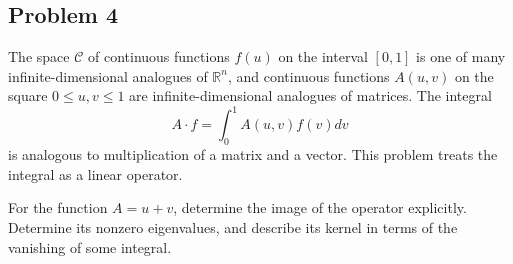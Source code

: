 \documentclass{article}
\theoremstyle{definition}
\newcommand{\R}{\mathbb{R}}
\begin{document}
\subsection*{Problem 4}

\begin{tcolorbox}
The space $\mathcal{C}$ of continuous functions $f(u)$ on the interval $[0,1]$ is one of many infinite-dimensional analogues of $\R^n$, and continuous functions $A(u,v)$ on the square $0 \leq u,v \leq 1$ are infinite-dimensional analogues of matrices.
The integral
\[ A \cdot f = \int_0^1 A(u,v) f(v) dv \]
is analogous to multiplication of a matrix and a vector.
This problem treats the integral as a linear operator.

For the function $A = u+v$, determine the image of the operator explicitly.
Determine its nonzero eigenvalues, and describe its kernel in terms of the vanishing of some integral.
\end{tcolorbox}
\end{document}
